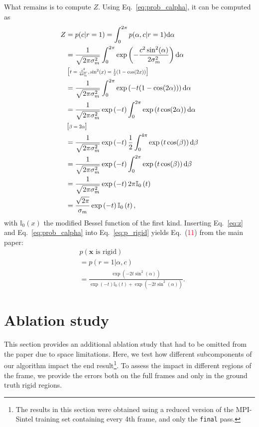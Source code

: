 \documentclass[10pt,twocolumn,letterpaper]{article}
\newcommand*{\Scale}[2][4]{\scalebox{#1}{$#2$}}
\begin{document}
What remains is to compute $Z$.
Using Eq.~\eqref{eq:prob_calpha}, it can be computed as
\begin{align}
Z &= p(c \vert r=1) = \int_{0}^{2\pi} p(\alpha, c \vert r=1 ) \mathrm{d}\alpha \nonumber \\
&= \frac{1}{\sqrt{2 \pi \sigma_m^2}} \int_{0}^{2\pi} \exp \left( - \frac{c^2 \sin^2(\alpha)}{2 \sigma_m^2} \right) \mathrm{d}\alpha \nonumber \\
& \left[ \Scale[0.75]{t = \frac{c^2}{4\sigma_m^2}, \sin^2(x) = \frac{1}{2}(1-\cos(2x))} \right] \nonumber \\
&= \frac{1}{\sqrt{2 \pi \sigma_m^2}} \int_{0}^{2\pi} \exp \left( - t (1-\cos(2\alpha)) \right) \mathrm{d}\alpha \nonumber \\
&= \frac{1}{\sqrt{2 \pi \sigma_m^2}} \exp\left( -t \right) \int_{0}^{2\pi} \exp \left( t \cos(2\alpha) \right) \mathrm{d}\alpha\nonumber \\
& \left[ \Scale[0.75]{\beta = 2\alpha} \right] \nonumber \\
&= \frac{1}{\sqrt{2 \pi \sigma_m^2}} \exp\left( -t \right) 
	\frac{1}{2} \int_{0}^{4\pi} \exp \left( t \cos(\beta) \right) \mathrm{d}\beta \nonumber \\
&= \frac{1}{\sqrt{2 \pi \sigma_m^2}} \exp\left( -t \right) 
	\int_{0}^{2\pi} \exp \left( t \cos(\beta) \right) \mathrm{d}\beta \nonumber \\
&= \frac{1}{\sqrt{2 \pi \sigma_m^2}} \exp\left( - t \right) 
	2\pi \mathbb{I}_0 \left( t \right) \nonumber \\
&= \frac{\sqrt{2 \pi}}{\sigma_m} \exp\left( - t \right) 
	\mathbb{I}_0 \left( t \right), 
\label{eq:z}
\end{align}
with $\mathbb{I}_0(x)$ the modified Bessel function of the first kind.
Inserting Eq.~\eqref{eq:z} and Eq.~\eqref{eq:prob_calpha} into Eq.~\ref{eq:p_rigid} yields Eq.~(\textcolor{red}{11}) from the main paper:
\begin{align}
& p\left(\mathbf{x} \text{ is rigid} \right) \nonumber \\
&= 
p(r=1 \vert \alpha, c) \nonumber \\
&= \frac{\exp \left( - 2 t \sin^2 ( \alpha ) \right)}
{\exp(-t) \mathbb{I}_0(t) + \exp \left( -2t \sin^2 \left( \alpha \right) \right)}.
\end{align}



%
 

\section{Ablation study}
This section provides an additional ablation study that had to be omitted from the paper due to space limitations.
Here, we test how different subcomponents of our algorithm impact the end result\footnote{The results in this section were obtained using a reduced version of the MPI-Sintel training set containing every 4th frame, and only the \texttt{final} pass.}.
To assess the impact in different regions of the frame, we provide the errors both on the full frames and only in the ground truth rigid regions.
\end{document}
